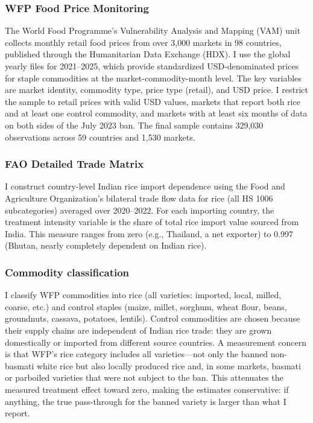 \documentclass[12pt]{article}
\begin{document}
\subsubsection*{WFP Food Price Monitoring} The World Food Programme's Vulnerability Analysis and Mapping (VAM) unit collects monthly retail food prices from over 3,000 markets in 98 countries, published through the Humanitarian Data Exchange (HDX). I use the global yearly files for 2021--2025, which provide standardized USD-denominated prices for staple commodities at the market-commodity-month level. The key variables are market identity, commodity type, price type (retail), and USD price. I restrict the sample to retail prices with valid USD values, markets that report both rice and at least one control commodity, and markets with at least six months of data on both sides of the July 2023 ban. The final sample contains 329,030 observations across 59 countries and 1,530 markets.

\subsubsection*{FAO Detailed Trade Matrix} I construct country-level Indian rice import dependence using the Food and Agriculture Organization's bilateral trade flow data for rice (all HS 1006 subcategories) averaged over 2020--2022. For each importing country, the treatment intensity variable is the share of total rice import value sourced from India. This measure ranges from zero (e.g., Thailand, a net exporter) to 0.997 (Bhutan, nearly completely dependent on Indian rice).

\subsubsection*{Commodity classification} I classify WFP commodities into rice (all varieties: imported, local, milled, coarse, etc.) and control staples (maize, millet, sorghum, wheat flour, beans, groundnuts, cassava, potatoes, lentils). Control commodities are chosen because their supply chains are independent of Indian rice trade: they are grown domestically or imported from different source countries. A measurement concern is that WFP's rice category includes all varieties---not only the banned non-basmati white rice but also locally produced rice and, in some markets, basmati or parboiled varieties that were not subject to the ban. This attenuates the measured treatment effect toward zero, making the estimates conservative: if anything, the true pass-through for the banned variety is larger than what I report.
\end{document}
